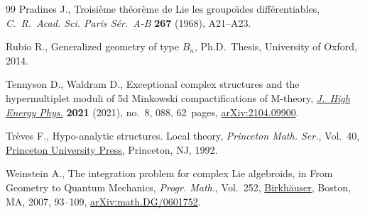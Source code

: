 \documentclass[pdftex]{sigma}
\numberwithin{equation}{section}
\begin{document}
\begin{thebibliography}{99}
Pradines J., Troisi\`eme th\'eor\`eme de {L}ie les groupo\"{\i}des
 diff\'erentiables, \textit{C.~R.~Acad. Sci. Paris S\'er.~A-B} \textbf{267}
 (1968), A21--A23.

Rubio R., Generalized geometry of type {$B_n$}, Ph.D.~Thesis, {U}niversity of
 Oxford, 2014.

Tennyson D., Waldram D., Exceptional complex structures and the hypermultiplet
 moduli of 5d {M}inkowski compactifications of {M}-theory,
 \href{https://doi.org/10.1007/jhep08(2021)088}{\textit{J.~High Energy Phys.}}
 \textbf{2021} (2021), no.~8, 088, 62~pages,
 \href{http://arxiv.org/abs/2104.09900}{arXiv:2104.09900}.

Tr\`eves F., Hypo-analytic structures. Local theory, \textit{Princeton Math.
 Ser.}, Vol.~40, \href{https://doi.org/10.1515/9781400862887}{Princeton
 University Press}, Princeton, NJ, 1992.

Weinstein A., The integration problem for complex {L}ie algebroids, in From
 Geometry to Quantum Mechanics, \textit{Progr. Math.}, Vol.~252,
 \href{https://doi.org/10.1007/978-0-8176-4530-4_7}{Birkh\"auser}, Boston, MA,
 2007, 93--109,
 \href{http://arxiv.org/abs/math.DG/0601752}{arXiv:math.DG/0601752}.

\end{thebibliography}\LastPageEnding
\end{document}
